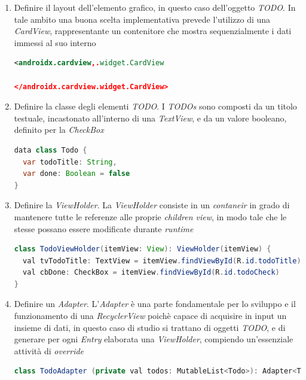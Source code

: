 \documentclass{article}
\begin{document}
\begin{enumerate}
  \itemsep0em
  \renewcommand{\labelenumi}{-}
  \item Definire il layout dell'elemento grafico, in questo caso dell'oggetto \textit{TODO}. In tale ambito una buona scelta implementativa prevede l'utilizzo di una \textit{CardView}, rappresentante un contenitore che mostra sequenzialmente i dati immessi al suo interno\\
  \begin{lstlisting}[language=XML, title=Definizione della CardView degli elementi TODO]
<androidx.cardview,.widget.CardView

</androidx.cardview.widget.CardView>
  \end{lstlisting}
  \item Definire la classe degli elementi \textit{TODO}. I \textit{TODOs} sono composti da un titolo testuale, incastonato all'interno di una \textit{TextView}, e da un valore booleano, definito per la \textit{CheckBox}\\
  \begin{lstlisting}[language=JAVA, title=Definizione della classe TODO]
data class Todo {
  var todoTitle: String,
  var done: Boolean = false
}
  \end{lstlisting}
  \item Definire la \textit{ViewHolder}. La \textit{ViewHolder} consiste in un \textit{contaneir} in grado di mantenere tutte le referenze alle proprie \textit{children view}, in modo tale che le stesse possano essere modificate durante \textit{runtime}\\
  \begin{lstlisting}[language=JAVA, title=Definizione della ViewHolder]
class TodoViewHolder(itemView: View): ViewHolder(itemView) {
  val tvTodoTitle: TextView = itemView.findViewById(R.id.todoTitle)
  val cbDone: CheckBox = itemView.findViewById(R.id.todoCheck)
}
  \end{lstlisting}
  \item Definire un \textit{Adapter}. L'\textit{Adapter} è una parte fondamentale per lo sviluppo e il funzionamento di una \textit{RecyclerView} poichè capace di acquisire in input un insieme di dati, in questo caso di studio si trattano di oggetti \textit{TODO}, e di generare per ogni \textit{Entry} elaborata una \textit{ViewHolder}, compiendo un'essenziale attività di \textit{override}
  \begin{lstlisting}[language=JAVA, title=Definizione dell'Adapter]
class TodoAdapter (private val todos: MutableList<Todo>): Adapter<TodoViewHolder>() {

\end{lstlisting}
\end{enumerate}
\end{document}
